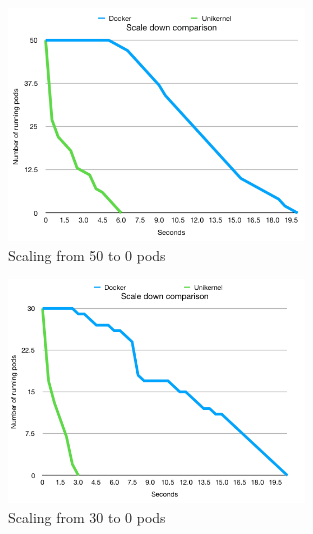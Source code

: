  \begin{figure}[htpb]
    \centering
    \includegraphics[width=0.7\textwidth]{figures/scales/scale-down-50.png}
    \caption{Scaling from 50 to 0 pods } \label{fig:scale-down-50}
  \end{figure}
  
  \begin{figure}[htpb]
    \centering
    \includegraphics[width=0.7\textwidth]{figures/scales/scale-down-30.png}
    \caption{Scaling from 30 to 0 pods } \label{fig:scale-down-30}
  \end{figure}
  
